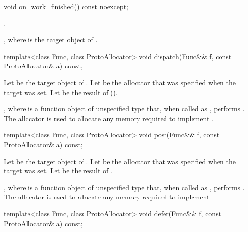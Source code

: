 %
\begin{itemdecl}
void on_work_finished() const noexcept;
\end{itemdecl}

\begin{itemdescr}
\pnum
\changed{\requires}{\expects} .

\pnum
\effects {}, where  is the target object of .
\end{itemdescr}

%
\begin{itemdecl}
template<class Func, class ProtoAllocator>
  void dispatch(Func&& f, const ProtoAllocator& a) const;
\end{itemdecl}

\begin{itemdescr}
\pnum
Let  be the target object of . Let  be the allocator that was specified when the target was set. Let  be the result of  ().

\pnum
\effects {}, where  is a function object of unspecified type that, when called as , performs . The allocator  is used to allocate any memory required to implement .
\end{itemdescr}

%
\begin{itemdecl}
template<class Func, class ProtoAllocator>
  void post(Func&& f, const ProtoAllocator& a) const;
\end{itemdecl}

\begin{itemdescr}
\pnum
Let  be the target object of . Let  be the allocator that was specified when the target was set. Let  be the result of .

\pnum
\effects {}, where  is a function object of unspecified type that, when called as , performs . The allocator  is used to allocate any memory required to implement .
\end{itemdescr}

%
\begin{itemdecl}
template<class Func, class ProtoAllocator>
  void defer(Func&& f, const ProtoAllocator& a) const;
\end{itemdecl}


